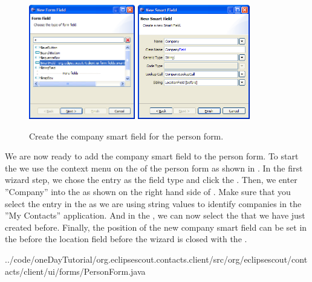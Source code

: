\documentclass[a4paper,10pt,twoside]{book}
\begin{document}
\begin{figure}
\includegraphics[height=5cm]{new_smartfield_company_1.png} \hspace{5mm}
\includegraphics[height=5cm]{new_smartfield_company_2.png}
\caption{Create the company smart field for the person form.}
\end{figure}

We are now ready to add the company smart field to the person form. 
To start the  we use the context menu on the  of the person form as shown in .
In the first wizard step, we chose the  entry as the field type and click the . 
Then, we enter ''Company'' into the  as shown on the right hand side of . 
Make sure that you select the  entry in the  as we are using string values to identify companies in the ''My Contacts'' application. 
And in the , we can now select the  that we have just created before. 
Finally, the position of the new company smart field can be set in the  before the location field before the wizard is closed with the . 


{../code/oneDayTutorial/org.eclipsescout.contacts.client/src/org/eclipsescout/contacts/client/ui/forms/PersonForm.java}
\end{document}
